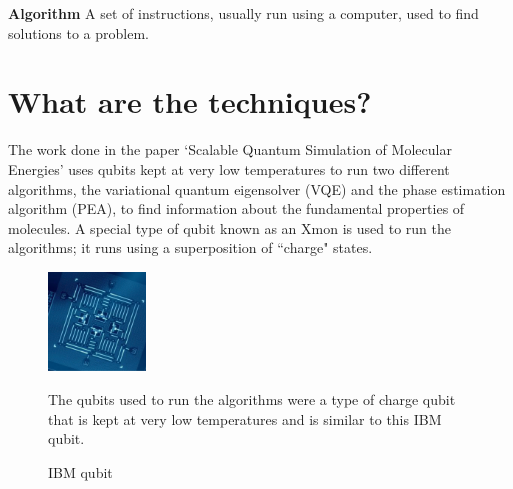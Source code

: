 \documentclass[14pt,landscape,color=UCLdarkred,margin=3cm]{uclposter}
\begin{document}
\begin{multicols}{3}
\begin{highlightbox}
\end{highlightbox}

\begin{highlightbox}
\textbf{Algorithm} A set of instructions, usually run using a computer, used to find solutions to a problem. 
\end{highlightbox}

\columnbreak

\section*{What are the techniques?}


The work done in the paper `Scalable Quantum Simulation of Molecular Energies' uses qubits kept at very low temperatures to run two different algorithms, the variational quantum eigensolver (VQE) and the phase estimation algorithm (PEA),  to find information about the fundamental properties of molecules. A special type of qubit known as an Xmon is used to run the algorithms; it runs using a superposition of ``charge" states.
\\
\begin{figure}[H]
  \begin{center}
\setlength{\fboxsep}{0.5em}
  \begin{minipage}[c]{9em}
  \begin{center}
  \includegraphics[width=7em]{4_Qubit.png}
    \caption{IBM qubit}
  \end{center}
    
  \end{minipage}
  \qquad
  \begin{minipage}[c]{20em}

The qubits used to run the algorithms were a type of charge qubit that is kept at very low temperatures and is similar to this IBM qubit.

  \end{minipage}
  \end{center}


\end{figure}
\end{multicols}
\end{document}
